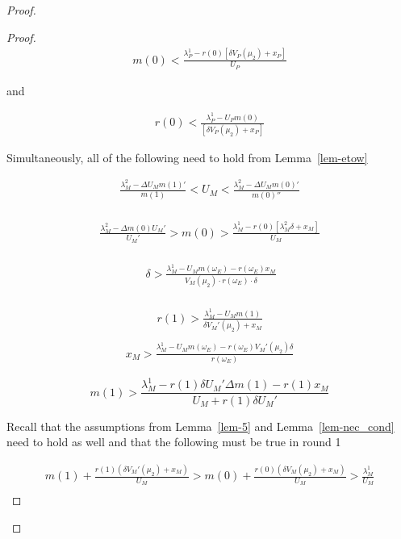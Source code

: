 \documentclass[
  12pt,
]{article}
\theoremstyle{plain}
\theoremstyle{plain}
\theoremstyle{remark}
\begin{document}
\begin{proof}
\begin{proof}
\[
\begin{aligned}
m(0) < \frac{\lambda^1_P -r(0)[\delta V_P(\mu_2) + x_P]}{U_P}
\end{aligned}
\]

and

\[
\begin{aligned}
r(0) < \frac{\lambda^1_P - U_P m(0)}{[\delta V_P(\mu_2) + x_P ]}
\end{aligned}
\]

Simultaneously, all of the following need to hold from
Lemma~\ref{lem-etow}

\[
\begin{aligned}
\frac{\lambda_M^2 - \Delta U_M m(1)'}{m(1)}< U_M < \frac{\lambda_M^2 - \Delta U_M m(0)'}{m(0)''}\\
\end{aligned}
\]

\[
\begin{aligned}
\frac{\lambda_M^2 - \Delta m(0) U_M'}{U_M'}  > m(0) > \frac{\lambda_M^1- r(0)[\lambda_M^2 \delta + x_M]}{U_M}\\
\end{aligned}
\]

\[
\begin{aligned}\
\delta > \frac{\lambda_M^1 - U_M m(\omega_E) - r(\omega_E) x_M}{V_M (\mu_2)\cdot r(\omega_E) \cdot \delta}\\
\end{aligned}
\]

\[
\begin{aligned}
r(1) > \frac{\lambda_M^1 - U_M m(1)}{\delta V_M'(\mu_2) + x_M}\\
\end{aligned}
\] \[
\begin{aligned}
x_M > \frac{\lambda_M^1- U_M m(\omega_E) - r(\omega_E) V_M'(\mu_2) \delta}{r(\omega_E)}
\end{aligned}
\]

\[
m(1) > \frac{\lambda_M^1- r(1) \delta U_M' \Delta m(1) - r(1) x_M}{U_M + r(1) \delta U_M'}
\]

Recall that the assumptions from Lemma~\ref{lem-5} and
Lemma~\ref{lem-nec_cond} need to hold as well and that the following
must be true in round 1

\[
\begin{aligned}
m(1) + \frac{r(1)(\delta V_M'(\mu_2) + x_M)}{U_M} >  m(0) + \frac{r(0)(\delta V_M(\mu_2) + x_M)}{U_M} > \frac{\lambda_M^1}{U_M} \\
\end{aligned}
\]


\end{proof}
\end{proof}
\end{document}
